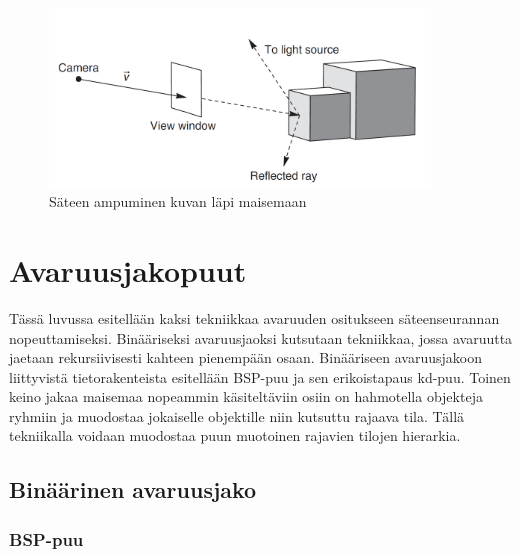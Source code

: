 \documentclass[a4paper, 12pt, titlepage]{article}
\begin{document}
\begin{figure}
 \centering 
 \includegraphics[width=0.9\textwidth]{img/raytracing.png}
 \vspace{0.4cm}
 \caption{Säteen ampuminen kuvan läpi maisemaan \citep{janke}}
 \label{raytracing}
 \vspace{-0.5cm}
\end{figure}


\vspace{-0.5cm}

\newpage
\section{Avaruusjakopuut}

Tässä luvussa esitellään kaksi tekniikkaa avaruuden ositukseen säteenseurannan nopeuttamiseksi. Binääriseksi avaruusjaoksi kutsutaan tekniikkaa, jossa avaruutta jaetaan rekursiivisesti kahteen pienempään osaan. Binääriseen avaruusjakoon liittyvistä tietorakenteista esitellään BSP-puu ja sen erikoistapaus kd-puu. Toinen keino jakaa maisemaa nopeammin käsiteltäviin osiin on hahmotella objekteja ryhmiin ja muodostaa jokaiselle objektille niin kutsuttu rajaava tila. Tällä tekniikalla voidaan muodostaa puun muotoinen rajavien tilojen hierarkia. 

\subsection{Binäärinen avaruusjako}
\subsubsection{BSP-puu}
\end{document}
